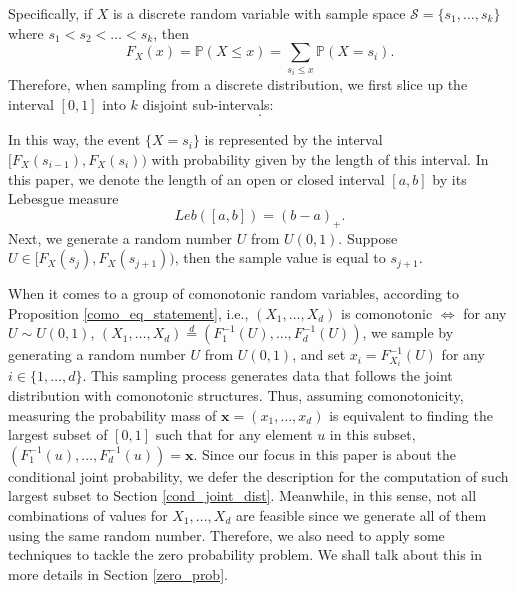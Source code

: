 \documentclass[twoside,11pt]{article}
\begin{document}
Specifically, if $X$ is a discrete random variable with sample space $\mathcal{S}=\{s_1,\dots,s_k\}$ where $s_1<s_2<\dots <s_k$, then 
\begin{equation*}
    F_X(x)=\mathbb{P}(X\leq x)=\sum_{s_i\leq x}\mathbb{P}(X=s_i).
\end{equation*}
Therefore, when sampling from a discrete distribution, we first slice up the interval $[0,1]$ into $k$ disjoint sub-intervals: 
\begin{displaymath}
    [{0,F_X(s_1)}),[{F_X(s_1),F_X(s_2)}),\dots,[{F_X(s_{k-1}),1}].
\end{displaymath}

In this way, the event $\{X=s_i\}$ is represented by the interval $[F_X(s_{i-1}),F_X(s_i))$ with probability given by the length of this interval. In this paper, we denote the length of an open or closed interval $[a,b]$ by its Lebesgue measure 
\begin{equation*}
    Leb([a,b])=(b-a)_+.
\end{equation*}
Next, we generate a random number $U$ from $U(0,1)$. Suppose $U\in [F_X(s_j), F_X(s_{j+1}))$, then the sample value is equal to $s_{j+1}$. 

When it comes to a group of comonotonic random variables, according to Proposition \ref{como_eq_statement}, i.e., $(X_1,\dots,X_d)$ is comonotonic $\Leftrightarrow$ for any $U \sim U(0,1)$, $(X_1,\dots,X_d)\stackrel{d}{=}(F_{1}^{-1}(U),\dots,F_{d}^{-1}(U))$, we sample by generating a random number $U$ from $U(0,1)$, and set $x_i = F_{X_i}^{-1}(U)$ for any $i\in\{1,\dots,d\}$. This sampling process generates data that follows the joint distribution with comonotonic structures. Thus, assuming comonotonicity, measuring the probability mass of $\mathbf{x}=(x_1,\dots,x_d)$ is equivalent to finding the largest subset of $[0,1]$ such that for any element $u$ in this subset, $(F_{1}^{-1}(u),\dots,F_{d}^{-1}(u)) = \mathbf{x}$. Since our focus in this paper is about the conditional joint probability, we defer the description for the computation of such largest subset to Section \ref{cond_joint_dist}. Meanwhile, in this sense, not all combinations of values for $X_1,\dots,X_d$ are feasible since we generate all of them using the same random number. Therefore, we also need to apply some techniques to tackle the zero probability problem. We shall talk about this in more details in Section \ref{zero_prob}.
\end{document}
